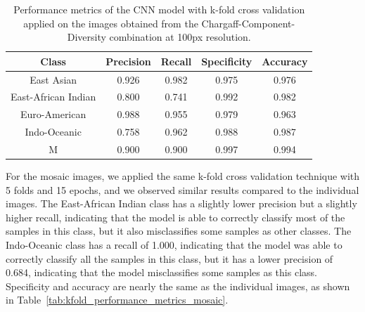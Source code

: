 \begin{table}[H]
	\centering
	\begin{tabular}{|c|c|c|c|c|}
		\hline
		\textbf{Class}      & \textbf{Precision} & \textbf{Recall} & \textbf{Specificity} & \textbf{Accuracy} \\
		\hline
		East Asian          & 0.926              & 0.982           & 0.975                & 0.976             \\
		East-African Indian & 0.800              & 0.741           & 0.992                & 0.982             \\
		Euro-American       & 0.988              & 0.955           & 0.979                & 0.963             \\
		Indo-Oceanic        & 0.758              & 0.962           & 0.988                & 0.987             \\
		M                   & 0.900              & 0.900           & 0.997                & 0.994             \\
		\hline
	\end{tabular}
	\caption{Performance metrics of the CNN model with k-fold cross validation applied on the images obtained from the Chargaff-Component-Diversity
		combination at 100px resolution.}
	\label{tab:kfold_performance_metrics}
\end{table}

For the mosaic images, we applied the same k-fold cross validation technique with 5 folds and 15 epochs, and we observed similar results compared to the
individual images. The East-African Indian class has a slightly lower precision but a slightly higher recall, indicating that the model is able to
correctly classify most of the samples in this class, but it also misclassifies some samples as other classes. The Indo-Oceanic class has a recall of 1.000,
indicating that the model was able to correctly classify all the samples in this class, but it has a lower precision of 0.684, indicating that the model
misclassifies some samples as this class. Specificity and accuracy are nearly the same as the individual images, as shown in
Table~\ref{tab:kfold_performance_metrics_mosaic}.

